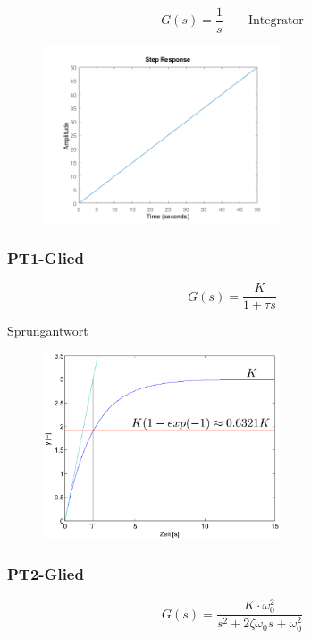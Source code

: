 \documentclass[
  10pt,
  a4paper,
  twocolumn]{article}
\numberwithin{equation}{section}
\begin{document}
\[
G(s)=\frac1{s}\qquad\text{Integrator}
\]

\begin{figure}[H]

{\centering \includegraphics[width=7cm,height=\textheight]{images/paste-22.png}

}

\end{figure}

\hypertarget{pt1-glied}{%
\subsubsection{PT1-Glied}\label{pt1-glied}}

\[
G(s)=\frac{K}{1+\tau s}
\]

Sprungantwort

\begin{figure}[H]

{\centering \includegraphics[width=7cm,height=\textheight]{images/paste-20.png}

}

\end{figure}

\hypertarget{pt2-glied}{%
\subsubsection{PT2-Glied}\label{pt2-glied}}

\[
G(s)=\frac{K\cdot \omega_0^2}{s^2+2\zeta\omega_0 s+\omega_0^2}
\]
\end{document}
